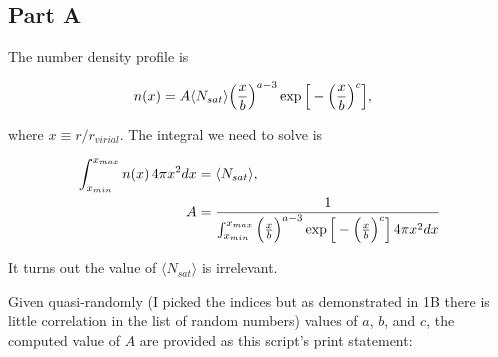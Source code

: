 \subsection{Part A}

The number density profile is

\begin{align}
n(x) &= A \langle N_{sat} \rangle \Big({x\over b}\Big)^{a-3} \exp\Big[-\Big({x\over b}\Big)^{c}\Big],
\end{align}

where $x \equiv r/r_{virial}$. The integral we need to solve is

\begin{align}
\int_{x_{min}}^{x_{max}} n(x) \, 4\pi x^{2}  dx &= \langle N_{sat} \rangle, \\
A &= {1 \over \int_{x_{min}}^{x_{max}}  \Big({x\over b}\Big)^{a-3} \exp\Big[-\Big({x\over b}\Big)^{c}\Big] \, 4\pi x^{2} dx}
\end{align}

It turns out the value of $\langle N_{sat} \rangle$ is irrelevant.



Given quasi-randomly (I picked the indices but as demonstrated in 1B there is little correlation in the list of random numbers) values of $a$, $b$, and $c$, the computed value of $A$ are provided as this script's print statement:


